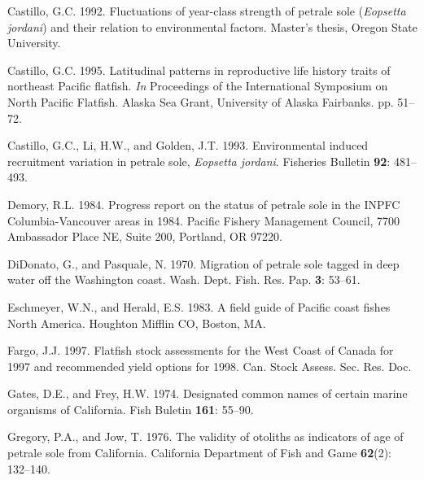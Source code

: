 \documentclass[11pt,
  english,
  letterpaper,
]{article}
\newlength{\cslhangindent}
\newenvironment{CSLReferences}[2] %
 {%
  \setlength{\parindent}{0pt}
  \ifodd #1 \everypar{\setlength{\hangindent}{\cslhangindent}}\ignorespaces\fi
  \ifnum #2 > 0
  \setlength{\parskip}{#2\baselineskip}
  \fi
 }%
 {}
\begin{document}
\begin{CSLReferences}{1}{0}
\leavevmode{}%
Castillo, G.C. 1992. Fluctuations of year-class strength of petrale sole (\emph{{Eopsetta} jordani}) and their relation to environmental factors. Master's thesis, Oregon State University.

\leavevmode{}%
Castillo, G.C. 1995. Latitudinal patterns in reproductive life history traits of northeast {Pacific} flatfish. \emph{In} Proceedings of the {International} {Symposium} on {North} {Pacific} {Flatfish}. Alaska Sea Grant, University of Alaska Fairbanks. pp. 51--72.

\leavevmode{}%
Castillo, G.C., Li, H.W., and Golden, J.T. 1993. Environmental induced recruitment variation in petrale sole, \emph{{Eopsetta} jordani}. Fisheries Bulletin \textbf{92}: 481--493.

\leavevmode{}%
Demory, R.L. 1984. Progress report on the status of petrale sole in the {INPFC} {Columbia}-{Vancouver} areas in 1984. Pacific Fishery Management Council, 7700 Ambassador Place NE, Suite 200, Portland, OR 97220.

\leavevmode{}%
DiDonato, G., and Pasquale, N. 1970. Migration of petrale sole tagged in deep water off the {Washington} coast. Wash. Dept. Fish. Res. Pap. \textbf{3}: 53--61.

\leavevmode{}%
Eschmeyer, W.N., and Herald, E.S. 1983. A field guide of {Pacific} coast fishes {North} {America}. Houghton Mifflin CO, Boston, MA.

\leavevmode{}%
Fargo, J.J. 1997. Flatfish stock assessments for the {West} {Coast} of {Canada} for 1997 and recommended yield options for 1998. Can. Stock Assess. Sec. Res. Doc.

\leavevmode{}%
Gates, D.E., and Frey, H.W. 1974. Designated common names of certain marine organisms of {California}. Fish Buletin \textbf{161}: 55--90.

\leavevmode{}%
Gregory, P.A., and Jow, T. 1976. The validity of otoliths as indicators of age of petrale sole from {California}. California Department of Fish and Game \textbf{62}(2): 132--140.


\end{CSLReferences}
\end{document}
